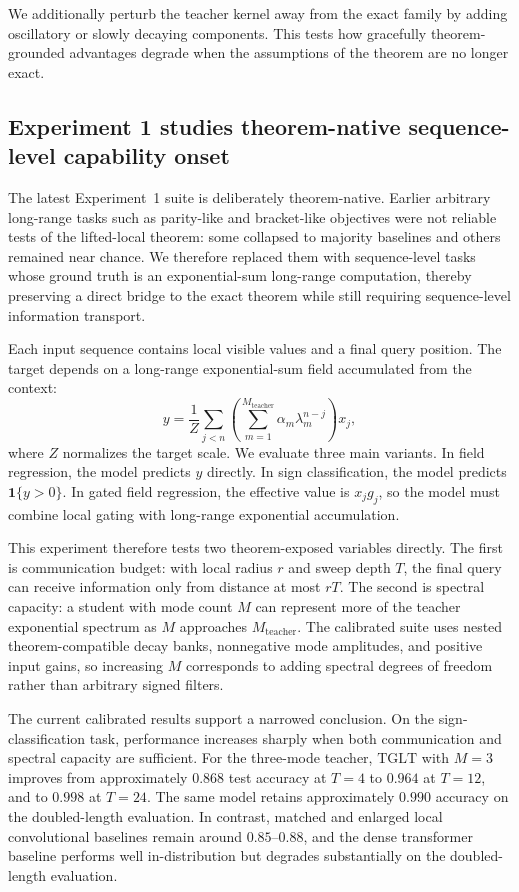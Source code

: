 \documentclass[11pt]{article}
\theoremstyle{definition}
\newcommand{\TGLT}{\ensuremath{\mathrm{TGLT}}}
\begin{document}
We additionally perturb the teacher kernel away from the exact family by adding oscillatory or slowly decaying components. This tests how gracefully theorem-grounded advantages degrade when the assumptions of the theorem are no longer exact.

\subsection*{Experiment 1 studies theorem-native sequence-level capability onset}

The latest Experiment~1 suite is deliberately theorem-native. Earlier arbitrary long-range tasks such as parity-like and bracket-like objectives were not reliable tests of the lifted-local theorem: some collapsed to majority baselines and others remained near chance. We therefore replaced them with sequence-level tasks whose ground truth is an exponential-sum long-range computation, thereby preserving a direct bridge to the exact theorem while still requiring sequence-level information transport.

Each input sequence contains local visible values and a final query position. The target depends on a long-range exponential-sum field accumulated from the context:
\begin{equation}
y
=
\frac{1}{Z}
\sum_{j<n}
\left(
\sum_{m=1}^{M_{\mathrm{teacher}}}
\alpha_m \lambda_m^{n-j}
\right) x_j ,
\label{eq:exp1-field-target}
\end{equation}
where \(Z\) normalizes the target scale. We evaluate three main variants. In field regression, the model predicts \(y\) directly. In sign classification, the model predicts \(\mathbf 1\{y>0\}\). In gated field regression, the effective value is \(x_j g_j\), so the model must combine local gating with long-range exponential accumulation.

This experiment therefore tests two theorem-exposed variables directly. The first is communication budget: with local radius \(r\) and sweep depth \(T\), the final query can receive information only from distance at most \(rT\). The second is spectral capacity: a student with mode count \(M\) can represent more of the teacher exponential spectrum as \(M\) approaches \(M_{\mathrm{teacher}}\). The calibrated suite uses nested theorem-compatible decay banks, nonnegative mode amplitudes, and positive input gains, so increasing \(M\) corresponds to adding spectral degrees of freedom rather than arbitrary signed filters.

The current calibrated results support a narrowed conclusion. On the sign-classification task, performance increases sharply when both communication and spectral capacity are sufficient. For the three-mode teacher, \TGLT{} with \(M=3\) improves from approximately \(0.868\) test accuracy at \(T=4\) to \(0.964\) at \(T=12\), and to \(0.998\) at \(T=24\). The same model retains approximately \(0.990\) accuracy on the doubled-length evaluation. In contrast, matched and enlarged local convolutional baselines remain around \(0.85\)--\(0.88\), and the dense transformer baseline performs well in-distribution but degrades substantially on the doubled-length evaluation.
\end{document}
